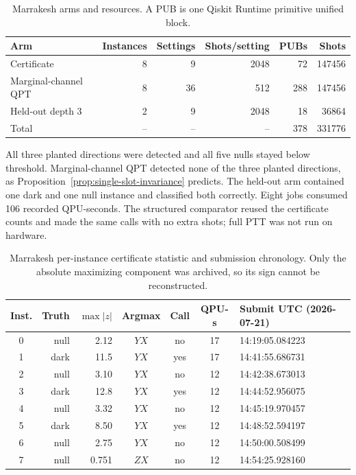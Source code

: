 \documentclass[aps,prl,reprint,superscriptaddress,nofootinbib]{revtex4-2}
\begin{document}
\begin{table}[t]
\caption{Marrakesh arms and resources.  A PUB is one Qiskit Runtime primitive unified block.}
\label{tab:marrakesh-arms}
\begin{ruledtabular}
\begin{tabular}{lrrrrr}
Arm & Instances & Settings & Shots/setting & PUBs & Shots\\
\hline
Certificate & 8 & 9 & 2048 & 72 & 147456\\
Marginal-channel QPT & 8 & 36 & 512 & 288 & 147456\\
Held-out depth 3 & 2 & 9 & 2048 & 18 & 36864\\
\hline
Total & -- & -- & -- & 378 & 331776\\
\end{tabular}
\end{ruledtabular}
\end{table}

All three planted directions were detected and all five nulls stayed below threshold.  Marginal-channel QPT detected none of the three planted directions, as Proposition~\ref{prop:single-slot-invariance} predicts.  The held-out arm contained one dark and one null instance and classified both correctly.  Eight jobs consumed 106 recorded QPU-seconds.  The structured comparator reused the certificate counts and made the same calls with no extra shots; full PTT was not run on hardware.

\begin{table}[t]
\caption{Marrakesh per-instance certificate statistic and submission chronology.  Only the absolute maximizing component was archived, so its sign cannot be reconstructed.}
\label{tab:marrakesh-instances}
\scriptsize
\begin{ruledtabular}
\begin{tabular}{crrcccl}
Inst. & Truth & $\max|z|$ & Argmax & Call & QPU-s & Submit UTC (2026-07-21)\\
\hline
0 & null & 2.12 & $YX$ & no & 17 & 14:19:05.084223\\
1 & dark & 11.5 & $YX$ & yes & 17 & 14:41:55.686731\\
2 & null & 3.10 & $YX$ & no & 12 & 14:42:38.673013\\
3 & dark & 12.8 & $YX$ & yes & 12 & 14:44:52.956075\\
4 & null & 3.32 & $YX$ & no & 12 & 14:45:19.970457\\
5 & dark & 8.50 & $YX$ & yes & 12 & 14:48:52.594197\\
6 & null & 2.75 & $YX$ & no & 12 & 14:50:00.508499\\
7 & null & 0.751 & $ZX$ & no & 12 & 14:54:25.928160\\
\end{tabular}
\end{ruledtabular}
\end{table}
\end{document}
